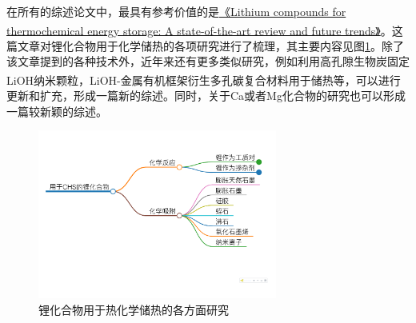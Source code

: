 \documentclass[oneside]{report}
\begin{document}
在所有的综述论文中，最具有参考价值的是\href{https://doi.org/10.1016/j.rser.2021.111381}{\color{blue}《Lithium compounds for thermochemical energy storage: A state-of-the-art review and future trends》}\textsuperscript{\cite{RN126}}。这篇文章对锂化合物用于化学储热的各项研究进行了梳理，其主要内容见图\ref{fig:锂化合物}。除了该文章提到的各种技术外，近年来还有更多类似研究，例如利用高孔隙生物炭固定LiOH纳米颗粒\textsuperscript{\cite{RN48}}，LiOH-金属有机框架衍生多孔碳复合材料用于储热\textsuperscript{\cite{RN49}}等，可以进行更新和扩充，形成一篇新的综述。同时，关于Ca或者Mg化合物的研究也可以形成一篇较新颖的综述。

\begin{figure}[H]
    \centering
    \includegraphics[width=0.7\textwidth]{image/锂化合物.pdf}
    \caption{锂化合物用于热化学储热的各方面研究}
    \label{fig:锂化合物}
\end{figure}






\end{document}
